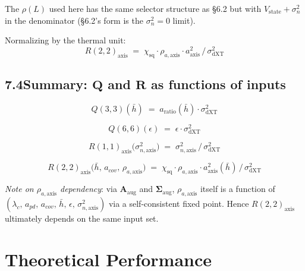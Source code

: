 \documentclass[11pt]{article}
\begin{document}
The $\rho(L)$ used here has the same selector structure as \S6.2 but with $V_\mathrm{state} + \sigma^2_n$ in the denominator (\S6.2's form is the $\sigma^2_n = 0$ limit).

Normalizing by the thermal unit:
\begin{equation}
\boxed{\;R(2,2)_\mathrm{axis} \;=\; \chi_\mathrm{sq} \cdot \rho_{a,\mathrm{axis}} \cdot a_\mathrm{axis}^2 \,/\, \sigma^2_\mathrm{dXT}\;}
\end{equation}

\bigskip
\subsection*{7.4\quad Summary: $\bm{Q}$ and $\bm{R}$ as functions of inputs}

\begin{equation}
\boxed{\;Q(3,3)(\bar h) \;=\; a_\mathrm{ratio}(\bar h)\cdot\sigma^2_\mathrm{dXT}\;}
\end{equation}

\begin{equation}
\boxed{\;Q(6,6)(\epsilon) \;=\; \epsilon\cdot\sigma^2_\mathrm{dXT}\;}
\end{equation}

\begin{equation}
\boxed{\;R(1,1)_\mathrm{axis}\bigl(\sigma^2_{n,\mathrm{axis}}\bigr) \;=\; \sigma^2_{n,\mathrm{axis}}\,/\,\sigma^2_\mathrm{dXT}\;}
\end{equation}

\begin{equation}
\boxed{\;R(2,2)_\mathrm{axis}\bigl(\bar h,\,a_{cov},\,\rho_{a,\mathrm{axis}}\bigr) \;=\; \chi_\mathrm{sq}\cdot\rho_{a,\mathrm{axis}}\cdot a_\mathrm{axis}^2(\bar h)\,/\,\sigma^2_\mathrm{dXT}\;}
\end{equation}

\noindent \emph{Note on $\rho_{a,\mathrm{axis}}$ dependency}: via $\bm{A}_\mathrm{aug}$ and $\bm{\Sigma}_\mathrm{aug}$, $\rho_{a,\mathrm{axis}}$ itself is a function of $(\lambda_c,\, a_{pd},\, a_{cov},\, \bar h,\, \epsilon,\, \sigma^2_{n,\mathrm{axis}})$ via a self-consistent fixed point. Hence $R(2,2)_\mathrm{axis}$ ultimately depends on the same input set.

\section{Theoretical Performance}
\end{document}
